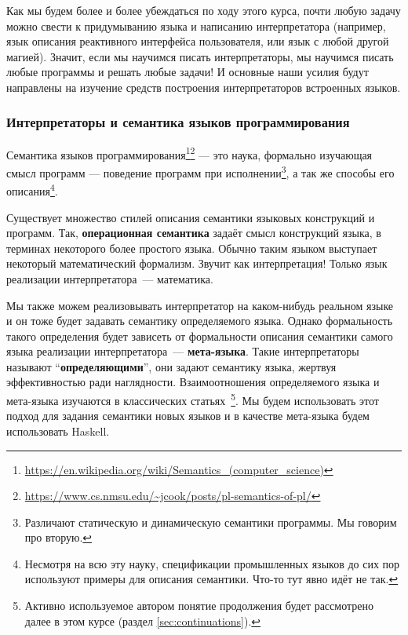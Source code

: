 \documentclass[12pt]{article}
\newcommand{\vocab}[1]{\textbf{#1}} %
\begin{document}
    Как мы будем более и более убеждаться по ходу этого курса, почти любую задачу можно свести к придумыванию языка и написанию интерпретатора (например, язык описания реактивного интерфейса пользователя, или язык с любой другой магией).
    Значит, если мы научимся писать интерпретаторы, мы научимся писать любые программы и решать любые задачи!
    И основные наши усилия будут направлены на изучение средств построения интерпретаторов встроенных языков.

    \subsubsection{Интерпретаторы и семантика языков программирования}

    Семантика языков программирования\footnote{\url{https://en.wikipedia.org/wiki/Semantics_(computer_science)}\label{note:sema-wiki}}\footnote{\url{https://www.cs.nmsu.edu/~jcook/posts/pl-semantics-of-pl/}\label{note:sema-cook}} --- это наука, формально изучающая смысл программ --- поведение программ при исполнении\footnote{Различают статическую и динамическую семантики программы. Мы говорим про вторую.}, а так же способы его описания\footnote{Несмотря на всю эту науку, спецификации промышленных языков до сих пор используют примеры для описания семантики. Что-то тут явно идёт не так.}.

    Существует множество стилей описания семантики языковых конструкций и программ.
    Так, \vocab{операционная семантика} задаёт смысл конструкций языка, в терминах некоторого более простого языка.
    Обычно таким языком выступает некоторый математический формализм.
    Звучит как интерпретация!
    Только язык реализации интерпретатора~--- математика.

    Мы также можем реализовывать интерпретатор на каком-нибудь реальном языке и он тоже будет задавать семантику определяемого языка.
    Однако формальность такого определения будет зависеть от формальности описания семантики самого языка реализации интерпретатора~--- \vocab{мета-языка}.
    Такие интерпретаторы называют ``\vocab{определяющими}'', они задают семантику языка, жертвуя эффективностью ради наглядности.
    Взаимоотношения определяемого языка и мета-языка изучаются в классических статьях~\cite{reynolds1972definitional,reynolds1998definitional}\footnote{Активно используемое автором понятие продолжения будет рассмотрено далее в этом курсе (раздел \ref{sec:continuations}).}.
    Мы будем использовать этот подход для задания семантики новых языков и в качестве мета-языка будем использовать Haskell.
\end{document}
